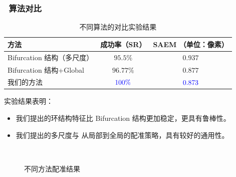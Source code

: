 \documentclass[notheorems,mathserif,table,compress]{beamer}  %
\begin{document}
\begin{frame}
\frametitle{~算法对比}
\begin{table}[!ht]
\caption{不同算法的对比实验结果}
\centering
\begin{tabular}{lcc}
\toprule
方法 & 成功率（SR）& SAEM （单位：像素）\\
\midrule
Bifurcation 结构（多尺度）& $95.5\%$ & $0.937$ \\
Bifurcation 结构+Global & $96.77\%$ & $0.877$ \\
我们的方法& ${\color{blue}{100\%}}$ & ${\color{blue}{0.873}}$\\
\bottomrule
\end{tabular}
\end{table}
实验结果表明：
\begin{itemize}
\item 我们提出的环结构特征比 Bifurcation 结构更加稳定，更具有鲁棒性。
\item 我们提出的多尺度与 从局部到全局的配准策略，具有较好的通用性。
\end{itemize}
\end{frame}


\begin{frame}
\begin{figure}
\setcounter{subfigure}{0}
\hspace{0.2in}
  \\
 \caption{不同方法配准结果}
\end{figure}
\end{frame}
\end{document}
